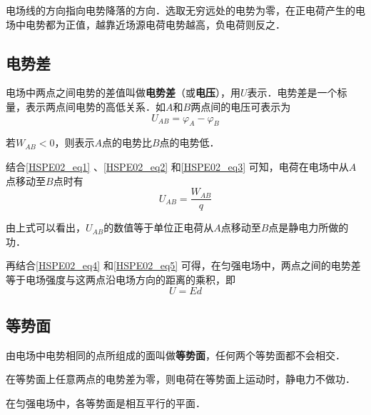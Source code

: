 电场线的方向指向电势降落的方向．选取无穷远处的电势为零，在正电荷产生的电场中电势都为正值，越靠近场源电荷电势越高，负电荷则反之．

\subsection{电势差}

电场中两点之间电势的差值叫做\textbf{电势差}（或\textbf{电压}），用$U$表示．电势差是一个标量，表示两点间电势的高低关系．如$A$和$B$两点间的电压可表示为
\begin{equation}\label{HSPE02_eq3}
U_{AB}=\varphi_A - \varphi_B
\end{equation}

若$W_{AB} < 0$，则表示$A$点的电势比$B$点的电势低．

结合\autoref{HSPE02_eq1} 、\autoref{HSPE02_eq2} 和\autoref{HSPE02_eq3} 可知，电荷在电场中从$A$点移动至$B$点时有
\begin{equation}\label{HSPE02_eq5}
U_{AB} = \frac{W_{AB}}{q}
\end{equation}

由上式可以看出，$U_{AB}$的数值等于单位正电荷从$A$点移动至$B$点是静电力所做的功．

再结合\autoref{HSPE02_eq4} 和\autoref{HSPE02_eq5} 可得，在匀强电场中，两点之间的电势差等于电场强度与这两点沿电场方向的距离的乘积，即
\begin{equation}
U=Ed
\end{equation}

\subsection{等势面}

由电场中电势相同的点所组成的面叫做\textbf{等势面}，任何两个等势面都不会相交．

在等势面上任意两点的电势差为零，则电荷在等势面上运动时，静电力不做功．

在匀强电场中，各等势面是相互平行的平面．
